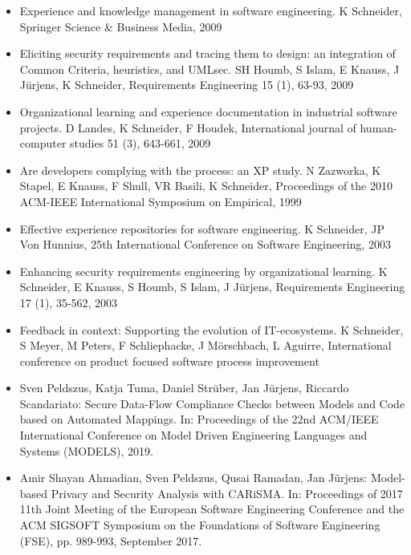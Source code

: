 

\begin{itemize}
	\vspace{-1em} \item Experience and knowledge management in software engineering. K Schneider, Springer Science \& Business Media, 2009
	\vspace{-1em} \item Eliciting security requirements and tracing them to design: an integration of Common Criteria, heuristics, and UMLsec. SH Houmb, S Islam, E Knauss, J Jürjens, K Schneider, Requirements Engineering 15 (1), 63-93, 2009
	\vspace{-1em} \item Organizational learning and experience documentation in industrial software projects. D Landes, K Schneider, F Houdek, International journal of human-computer studies 51 (3), 643-661, 2009
	\vspace{-1em} \item Are developers complying with the process: an XP study. N Zazworka, K Stapel, E Knauss, F Shull, VR Basili, K Schneider, Proceedings of the 2010 ACM-IEEE International Symposium on Empirical, 1999
	\vspace{-1em} \item Effective experience repositories for software engineering. K Schneider, JP Von Hunnius, 25th International Conference on Software Engineering, 2003
	\vspace{-1em} \item Enhancing security requirements engineering by organizational learning. K Schneider, E Knauss, S Houmb, S Islam, J Jürjens, Requirements Engineering 17 (1), 35-562, 2003
	\vspace{-1em} \item  Feedback in context: Supporting the evolution of IT-ecosystems. K Schneider, S Meyer, M Peters, F Schliephacke, J Mörschbach, L Aguirre, International conference on product focused software process improvement
	\vspace{-1em} \item Sven Peldszus, Katja Tuma, Daniel Strüber, Jan Jürjens, Riccardo Scandariato: Secure Data-Flow Compliance Checks between Models and Code based on Automated Mappings. In: Proceedings of the 22nd ACM/IEEE International Conference on Model Driven Engineering Languages and Systems (MODELS), 2019.
	\vspace{-1em} \item Amir Shayan Ahmadian, Sven Peldszus, Qusai Ramadan, Jan Jürjens: Model-based Privacy and Security Analysis with CARiSMA. In: Proceedings of 2017 11th Joint Meeting of the European Software Engineering Conference and the ACM SIGSOFT Symposium on the Foundations of Software Engineering (FSE), pp. 989-993, September 2017.
\end{itemize}

